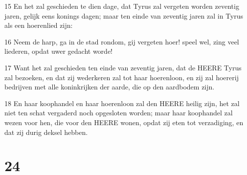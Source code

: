 \par 15 En het zal geschieden te dien dage, dat Tyrus zal vergeten worden zeventig jaren, gelijk eens konings dagen; maar ten einde van zeventig jaren zal in Tyrus als een hoerenlied zijn:
\par 16 Neem de harp, ga in de stad rondom, gij vergeten hoer! speel wel, zing veel liederen, opdat uwer gedacht worde!
\par 17 Want het zal geschieden ten einde van zeventig jaren, dat de HEERE Tyrus zal bezoeken, en dat zij wederkeren zal tot haar hoerenloon, en zij zal hoererij bedrijven met alle koninkrijken der aarde, die op den aardbodem zijn.
\par 18 En haar koophandel en haar hoerenloon zal den HEERE heilig zijn, het zal niet ten schat vergaderd noch opgesloten worden; maar haar koophandel zal wezen voor hen, die voor den HEERE wonen, opdat zij eten tot verzadiging, en dat zij durig deksel hebben.

\chapter{24}

